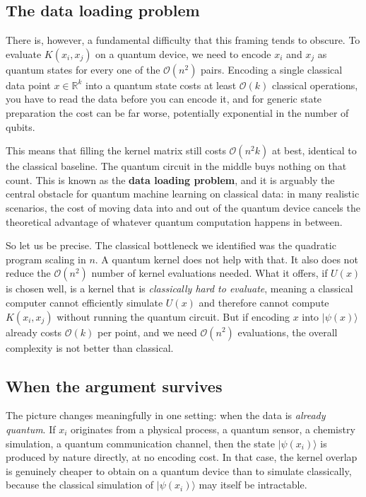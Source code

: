 \documentclass[12pt,a4paper]{article}
\begin{document}
\subsection{The data loading problem}

There is, however, a fundamental difficulty that this framing tends to
obscure. To evaluate $K(x_i, x_j)$ on a quantum device, we need to encode
$x_i$ and $x_j$ as quantum states for every one of the $\mathcal{O}(n^2)$
pairs. Encoding a single classical data point $x \in \mathbb{R}^k$ into a
quantum state costs at least $\mathcal{O}(k)$ classical operations,  you
have to read the data before you can encode it,  and for generic state
preparation the cost can be far worse, potentially exponential in the number
of qubits.

This means that filling the kernel matrix still costs $\mathcal{O}(n^2 k)$
at best, identical to the classical baseline. The quantum circuit in the
middle buys nothing on that count. This is known as the \textbf{data loading
problem}, and it is arguably the central obstacle for quantum machine
learning on classical data: in many realistic scenarios, the cost of moving
data into and out of the quantum device cancels the theoretical advantage of
whatever quantum computation happens in between.

So let us be precise. The classical bottleneck we identified was the
quadratic program scaling in $n$. A quantum kernel does not help with that.
It also does not reduce the $\mathcal{O}(n^2)$ number of kernel evaluations
needed. What it offers, if $U(x)$ is chosen well, is a kernel that is
\emph{classically hard to evaluate},  meaning a classical computer cannot
efficiently simulate $U(x)$ and therefore cannot compute $K(x_i, x_j)$
without running the quantum circuit. But if encoding $x$ into
$|\psi(x)\rangle$ already costs $\mathcal{O}(k)$ per point, and we need
$\mathcal{O}(n^2)$ evaluations, the overall complexity is not better than
classical.

\subsection{When the argument survives}

The picture changes meaningfully in one setting: when the data is
\emph{already quantum}. If $x_i$ originates from a physical process, 
a quantum sensor, a chemistry simulation, a quantum communication channel, then the state $|\psi(x_i)\rangle$ is produced by nature directly, at
no encoding cost. In that case, the kernel overlap is genuinely cheaper to
obtain on a quantum device than to simulate classically, because the
classical simulation of $|\psi(x_i)\rangle$ may itself be intractable.
\end{document}

